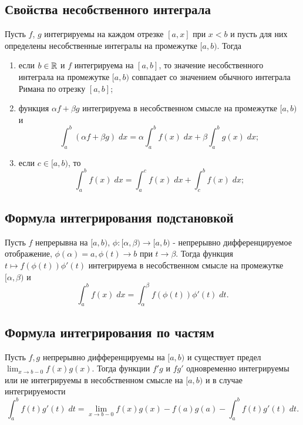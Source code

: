 	\subsection{Свойства несобственного интеграла}
	
	\begin{theorem}
		Пусть $f$, $g$ интегрируемы на каждом отрезке $[a, x]$ при $x < b$ и пусть для них определены несобственные интегралы на
		промежутке $[a, b)$. Тогда
		\begin{enumerate}
			\item если $b \in \mathbb R$ и $f$ интегрируема на $[a, b]$, то значение несобственного интеграла на промежутке $[a, b)$ совпадает со значением обычного интеграла Римана по отрезку $[a, b]$;
			\item функция $\alpha f + \beta g$ интегрируема в несобственном смысле на промежутке $[a, b)$ и
			\[ \int_a^b (\alpha f + \beta g) \; dx = \alpha \int_a^b f(x) \; dx + \beta \int_a^b g(x) \; dx; \]
			\item если $c \in [a, b)$, то
			\[ \int_a^b f(x) \; dx = \int_a^c f(x) \; dx + \int_c^b f(x) \; dx; \]
		\end{enumerate}
	\end{theorem}
	
	\subsection{Формула интегрирования подстановкой}
	
	\begin{theorem}
		Пусть $f$ непрерывна на $[a, b)$, $\phi: [\alpha, \beta) \rightarrow [a, b)$ - непрерывно дифференцируемое отображение, $\phi(\alpha) = a, \phi(t) \rightarrow b$ при
		$t \rightarrow \beta$. Тогда функция $t \mapsto f(\phi(t))\phi'(t)$ интегрируема в несобственном смысле на промежутке $[\alpha, \beta)$ и
		\[ \int_a^b f(x) \; dx = \int_{\alpha}^{\beta} f(\phi(t))\phi'(t) \; dt. \]
	\end{theorem}
	
	\subsection{Формула интегрирования по частям}
	
	\begin{theorem}
		Пусть $f, g$ непрерывно дифференцируемы на $[a, b)$ и существует предел $\displaystyle\lim_{x \to b - 0} f(x)g(x)$. Тогда функции $f'g$ и $fg'$ одновременно интегрируемы или не интегрируемы в несобственном смысле на $[a, b)$ и в случае интегрируемости
		\[ \int_a^b f(t)g'(t) \; dt = \lim_{x \to b - 0} f(x)g(x) - f(a)g(a) - \int_a^b f(t)g'(t) \; dt. \]
	\end{theorem}
	
